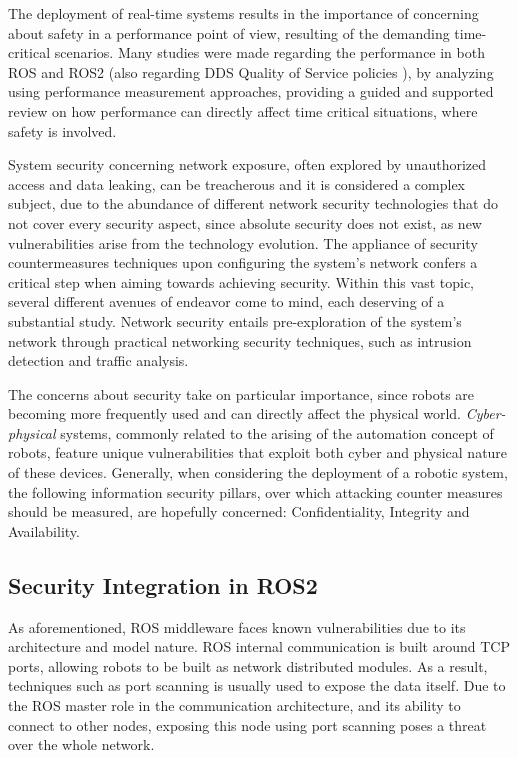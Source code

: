 The deployment of real-time systems results in the importance of concerning about safety in a performance point of view, resulting of the demanding time-critical scenarios. Many studies were made regarding the performance in both ROS and ROS2 (also regarding DDS Quality of Service policies \cite{maruyama2016exploring}), by analyzing using performance measurement approaches, providing a guided and supported review on how performance can directly affect time critical situations, where safety is involved. \cite{maruyama2016exploring, casini2019response} 

System security concerning network exposure, often explored by unauthorized access and data leaking, can be treacherous and it is considered a complex subject, due to the abundance of different network security technologies that do not cover every security aspect, since absolute security does not exist, as new vulnerabilities arise from the technology evolution.\cite{kaeo2004designing} The appliance of security countermeasures techniques upon configuring the system's network confers a critical step when aiming towards achieving security. Within this vast topic, several different avenues of endeavor come to mind, each deserving of a substantial study. Network security entails pre-exploration of the system's network through practical networking security techniques, such as intrusion detection and traffic analysis. \cite{marin2005network}

The concerns about security take on particular importance, since robots are becoming more frequently used and can directly affect the physical world. \textit{Cyber-physical} systems, commonly related to the arising of the automation concept of robots, feature unique vulnerabilities that exploit both cyber and physical nature of these devices. \cite{mcclean2013preliminary}Generally, when considering the deployment of a robotic system, the following information security pillars, over which attacking counter measures should be measured, are hopefully concerned: Confidentiality, Integrity and Availability. \cite{white2018procedurally}

\subsection{Security Integration in ROS2}

As aforementioned, ROS middleware faces known vulnerabilities due to its architecture and model nature. ROS internal communication is built around TCP ports, allowing robots to be built as network distributed modules. As a result, techniques such as port scanning is usually used to expose the data itself. Due to the ROS master role in the communication architecture, and its ability to connect to other nodes, exposing this node using port scanning poses a threat over the whole network. \cite{8794451} 

